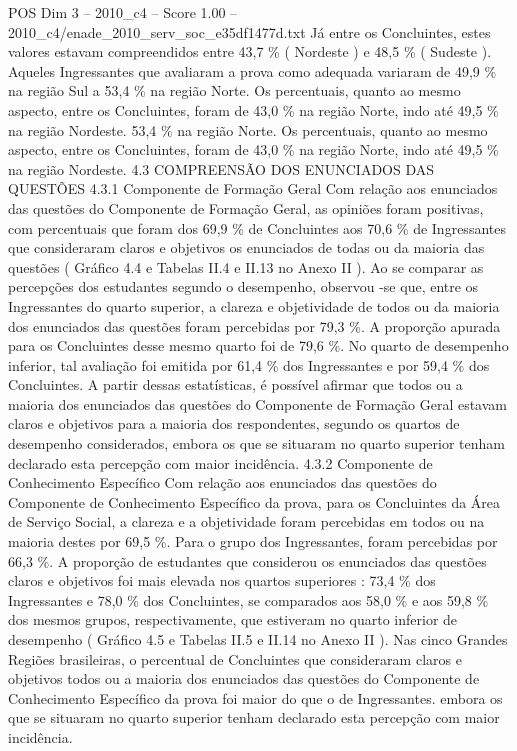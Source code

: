 \begin{textsample}{POS Dim 3 – 2010\_c4 – Score 1.00 – 2010\_c4/enade\_2010\_serv\_soc\_e35df1477d.txt}
Já entre os Concluintes, estes valores estavam compreendidos entre 43,7 \% ( Nordeste ) e 48,5 \% ( Sudeste ).
Aqueles Ingressantes que avaliaram a prova como adequada variaram de 49,9 \% na região Sul a 53,4 \% na região Norte.
Os percentuais, quanto ao mesmo aspecto, entre os Concluintes, foram de 43,0 \% na região Norte, indo até 49,5 \% na região Nordeste. 53,4 \% na região Norte.
Os percentuais, quanto ao mesmo aspecto, entre os Concluintes, foram de 43,0 \% na região Norte, indo até 49,5 \% na região Nordeste. 4.3 COMPREENSÃO DOS ENUNCIADOS DAS QUESTÕES 4.3.1 Componente de Formação Geral Com relação aos enunciados das questões do Componente de Formação Geral, as opiniões foram positivas, com percentuais que foram dos 69,9 \% de Concluintes aos 70,6 \% de Ingressantes que consideraram claros e objetivos os enunciados de todas ou da maioria das questões ( Gráfico 4.4 e Tabelas II.4 e II.13 no Anexo II ).
Ao se comparar as percepções dos estudantes segundo o desempenho, observou -se que, entre os Ingressantes do quarto superior, a clareza e objetividade de todos ou da maioria dos enunciados das questões foram percebidas por 79,3 \%.
A proporção apurada para os Concluintes desse mesmo quarto foi de 79,6 \%.
No quarto de desempenho inferior, tal avaliação foi emitida por 61,4 \% dos Ingressantes e por 59,4 \% dos Concluintes.
A partir dessas estatísticas, é possível afirmar que todos ou a maioria dos enunciados das questões do Componente de Formação Geral estavam claros e objetivos para a maioria dos respondentes, segundo os quartos de desempenho considerados, embora os que se situaram no quarto superior tenham declarado esta percepção com maior incidência. 4.3.2 Componente de Conhecimento Específico Com relação aos enunciados das questões do Componente de Conhecimento Específico da prova, para os Concluintes da Área de Serviço Social, a clareza e a objetividade foram percebidas em todos ou na maioria destes por 69,5 \%.
Para o grupo dos Ingressantes, foram percebidas por 66,3 \%.
A proporção de estudantes que considerou os enunciados das questões claros e objetivos foi mais elevada nos quartos superiores : 73,4 \% dos Ingressantes e 78,0 \% dos Concluintes, se comparados aos 58,0 \% e aos 59,8 \% dos mesmos grupos, respectivamente, que estiveram no quarto inferior de desempenho ( Gráfico 4.5 e Tabelas II.5 e II.14 no Anexo II ).
Nas cinco Grandes Regiões brasileiras, o percentual de Concluintes que consideraram claros e objetivos todos ou a maioria dos enunciados das questões do Componente de Conhecimento Específico da prova foi maior do que o de Ingressantes. embora os que se situaram no quarto superior tenham declarado esta percepção com maior incidência.

\end{textsample}
